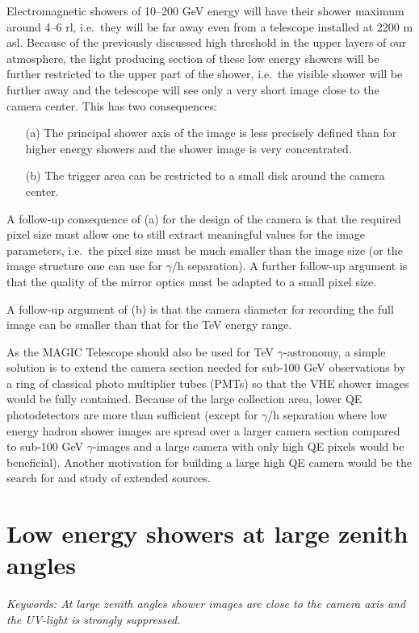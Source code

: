 \par\medskip Electromagnetic showers of 10--200 GeV energy will have
their shower maximum around 4--6 
rl, i.e.\ they will be far away even from a telescope 
installed at 2200 m asl. Because of the 
previously discussed high \Cerenkov threshold in the 
upper layers of our atmosphere, the light 
producing section of these low energy showers will be 
further restricted to the upper part of 
the shower, i.e.\ the visible shower will be further
away and the telescope will see only a very 
short image close to the camera center. This has two consequences: 
\begin{itemize}
\item[(a)]
The principal shower axis of the image is less precisely 
defined than for higher energy showers and 
the shower image is very concentrated.
\item[(b)]
The trigger area can be restricted to a small disk
around the camera center.
\end{itemize}
A follow-up consequence of (a) for the design of the camera is
that the required pixel size must 
allow one to still extract meaningful values for the
image parameters, i.e.\ the pixel size must 
be much smaller than the image size (or the 
image structure one can use for $\gamma$/h 
separation). A further follow-up argument is that the 
quality of the mirror optics must be adapted 
to a small pixel size. 

A follow-up argument of (b) is that the camera diameter
for recording the full image can be 
smaller than that for the TeV energy range.

As the MAGIC Telescope should also be used for TeV
$\gamma$-astronomy, 
a simple solution is to extend the camera
section needed for sub-100 GeV observations by a ring 
of classical photo multiplier tubes (PMTs) so that the VHE 
shower images would be fully contained. Because of the 
large collection area, lower QE 
photodetectors are more than sufficient (except for $\gamma$/h 
separation where low energy hadron 
shower images are spread over a larger camera section 
compared to sub-100 GeV $\gamma$-images 
and a large camera with only high QE pixels would be 
beneficial). Another motivation for building 
a large high QE camera would be the search for and
study of extended sources.

\newpage
\section{Low energy showers at large zenith angles}
\par\medskip
{\it Keywords: At large zenith angles shower images are close to the camera
axis and the UV-\Cerenkov light is strongly suppressed.}

